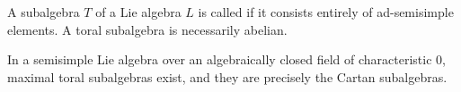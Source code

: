 A subalgebra $T$ of a Lie algebra $L$ is called  if it consists entirely of ad-semisimple elements. A toral subalgebra is necessarily abelian.

In a semisimple Lie algebra over an algebraically closed field of characteristic 0, maximal toral subalgebras exist, and they are precisely the Cartan subalgebras.
